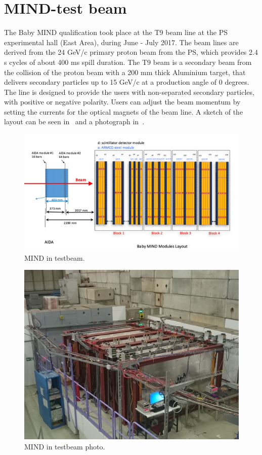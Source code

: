 \pagebreak
\section{MIND-test beam}

The Baby MIND qualification took place at the T9 beam line at the PS experimental hall (East Area), during June - July 2017. The beam lines are derived from the 24 GeV/c primary proton beam from the PS, which provides 2.4 s cycles of about 400 ms spill duration. The T9 beam is a secondary beam from the collision of the proton beam with a 200 mm thick Aluminium target, that delivers secondary particles up to 15 GeV/c at a production angle of 0 degrees. The line is designed to provide the users with non-separated secondary particles, with positive or negative polarity. Users can adjust the beam momentum by setting the currents for the optical magnets of the beam line. A sketch of the layout can be seen in~ and a photograph in~.

\begin{figure}[h!]
\centering
\includegraphics[width=\textwidth]{figures/MINDAIDAtestbeam.jpeg}
\caption{MIND in testbeam.}
\label{fig:MINDtb}
\end{figure}

\begin{figure}[h!]
\centering
\includegraphics[width=\textwidth]{figures/DSC_2619.JPG}
\caption{MIND in testbeam photo.}
\label{fig:MINDtbreal}
\end{figure}

